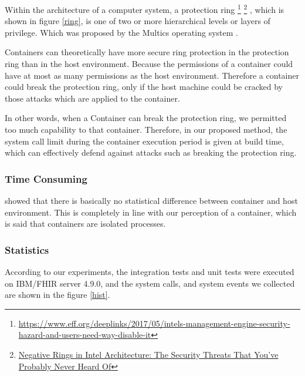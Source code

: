 Within the architecture of a computer system, a protection ring
\footnote{\url{https://www.eff.org/deeplinks/2017/05/intels-management-engine-security-hazard-and-users-need-way-disable-it}}
\footnote{\href{https://medium.com/swlh/negative-rings-in-intel-architecture-the-security-threats-youve-probably-never-heard-of-d725a4b6f831}
    {Negative Rings in Intel Architecture: The Security Threats That You’ve Probably Never Heard Of}}
, which is shown in figure \ref{ring}, is one of two or more
hierarchical levels or layers of privilege. Which was proposed by the Multics
operating system \cite{6234805}.

Containers can theoretically have more secure ring protection in the
protection ring than in the host environment. Because the permissions
of a container could have at most as many permissions as the host environment.
Therefore a container could break the protection ring, only if the host
machine could be cracked by those attacks which are applied to the container.

In other words, when a Container can break the protection ring, we permitted
too much capability to that container. Therefore, in our proposed method, the
system call limit during the container execution period is given at build time,
which can effectively defend against attacks such as breaking the protection ring.

\subsubsection{Time Consuming}
\textcite{KOZHIRBAYEV2017175} showed that there is basically no
statistical difference between container and host environment.
This is completely in line with our perception of a container,
which is said that containers are isolated processes.

\subsubsection{Statistics}
According to our experiments, the integration tests and unit
tests were executed on IBM/FHIR server 4.9.0, and the system calls,
and system events we collected are shown in the figure \ref{hist}.

